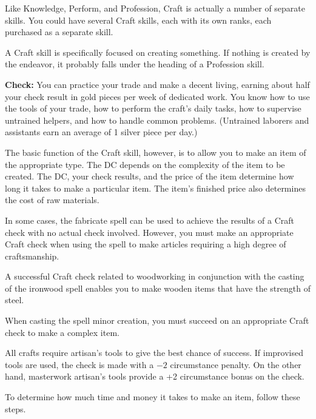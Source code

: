 Like Knowledge, Perform, and Profession, Craft is actually a number of separate skills. You could have several Craft skills, each with its own ranks, each purchased as a separate skill.

A Craft skill is specifically focused on creating something. If nothing is created by the endeavor, it probably falls under the heading of a Profession skill.

\textbf{Check:} You can practice your trade and make a decent living, earning about half your check result in gold pieces per week of dedicated work. You know how to use the tools of your trade, how to perform the craft's daily tasks, how to supervise untrained helpers, and how to handle common problems. (Untrained laborers and assistants earn an average of 1 silver piece per day.)

The basic function of the Craft skill, however, is to allow you to make an item of the appropriate type. The DC depends on the complexity of the item to be created. The DC, your check results, and the price of the item determine how long it takes to make a particular item. The item's finished price also determines the cost of raw materials.

In some cases, the fabricate spell can be used to achieve the results of a Craft check with no actual check involved. However, you must make an appropriate Craft check when using the spell to make articles requiring a high degree of craftsmanship.

A successful Craft check related to woodworking in conjunction with the casting of the ironwood spell enables you to make wooden items that have the strength of steel.

When casting the spell minor creation, you must succeed on an appropriate Craft check to make a complex item.

All crafts require artisan's tools to give the best chance of success. If improvised tools are used, the check is made with a $-2$ circumstance penalty. On the other hand, masterwork artisan's tools provide a +2 circumstance bonus on the check.

To determine how much time and money it takes to make an item, follow these steps.

